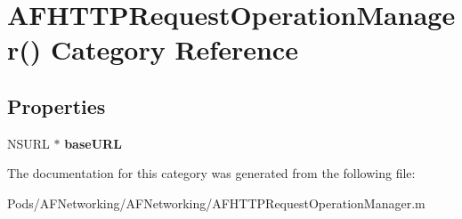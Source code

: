 \hypertarget{category_a_f_h_t_t_p_request_operation_manager_07_08}{}\section{A\+F\+H\+T\+T\+P\+Request\+Operation\+Manager() Category Reference}
\label{category_a_f_h_t_t_p_request_operation_manager_07_08}
\subsection*{Properties}
\begin{DoxyCompactItemize}
\item 
\mbox{\label{category_a_f_h_t_t_p_request_operation_manager_07_08_aab6e8a8836eead90575a417cd706c1b0}} 
N\+S\+U\+RL $\ast$ {\bfseries base\+U\+RL}
\end{DoxyCompactItemize}


The documentation for this category was generated from the following file\+:\begin{DoxyCompactItemize}
\item 
Pods/\+A\+F\+Networking/\+A\+F\+Networking/A\+F\+H\+T\+T\+P\+Request\+Operation\+Manager.\+m\end{DoxyCompactItemize}
